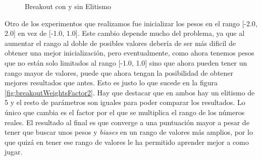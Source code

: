 \begin{figure}[!h]
    \centering
    
    
    \caption{Breakout con y sin Elitismo}
    \label{fig:breakoutWithAndWithoutElitism}
\end{figure}

Otro de los experimentos que realizamos fue inicializar los pesos en el rango [-2.0, 2.0] en vez de [-1.0, 1.0]. Este cambio depende mucho del problema, ya que al aumentar el rango al doble de posibles valores debería de ser más dificil de obtener una mejor inicialización, pero eventualmente, como ahora tenemos pesos que no están solo limitados al rango [-1.0, 1.0] sino que ahora pueden tener un rango mayor de valores, puede que ahora tengan la posibilidad de obtener mejores resultados que antes. Esto es justo lo que sucede en la figura \ref{fig:breakoutWeightsFactor2}. Hay que destacar que en ambos hay un elitismo de 5 y el resto de parámetros son iguales para poder comparar los resultados. Lo único que cambia es el factor por el que se multiplica el rango de los números reales. El resultado al final es que converge a una puntuación mayor a pesar de tener que buscar unos pesos y \textit{biases} en un rango de valores más amplios, por lo que quizá en tener ese rango de valores le ha permitido aprender mejor a como jugar.

